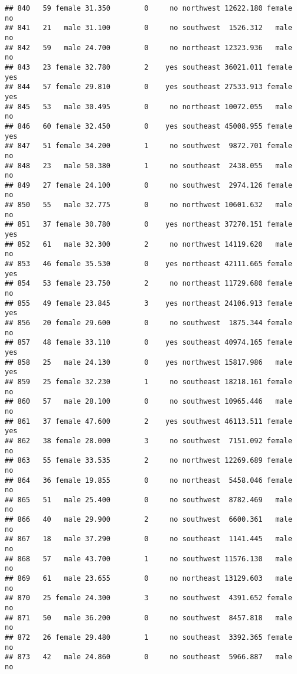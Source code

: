\documentclass[
]{article}
\begin{document}
\begin{verbatim}
## 840   59 female 31.350        0     no northwest 12622.180 female       no
## 841   21   male 31.100        0     no southwest  1526.312   male       no
## 842   59   male 24.700        0     no northeast 12323.936   male       no
## 843   23 female 32.780        2    yes southeast 36021.011 female      yes
## 844   57 female 29.810        0    yes southeast 27533.913 female      yes
## 845   53   male 30.495        0     no northeast 10072.055   male       no
## 846   60 female 32.450        0    yes southeast 45008.955 female      yes
## 847   51 female 34.200        1     no southwest  9872.701 female       no
## 848   23   male 50.380        1     no southeast  2438.055   male       no
## 849   27 female 24.100        0     no southwest  2974.126 female       no
## 850   55   male 32.775        0     no northwest 10601.632   male       no
## 851   37 female 30.780        0    yes northeast 37270.151 female      yes
## 852   61   male 32.300        2     no northwest 14119.620   male       no
## 853   46 female 35.530        0    yes northeast 42111.665 female      yes
## 854   53 female 23.750        2     no northeast 11729.680 female       no
## 855   49 female 23.845        3    yes northeast 24106.913 female      yes
## 856   20 female 29.600        0     no southwest  1875.344 female       no
## 857   48 female 33.110        0    yes southeast 40974.165 female      yes
## 858   25   male 24.130        0    yes northwest 15817.986   male      yes
## 859   25 female 32.230        1     no southeast 18218.161 female       no
## 860   57   male 28.100        0     no southwest 10965.446   male       no
## 861   37 female 47.600        2    yes southwest 46113.511 female      yes
## 862   38 female 28.000        3     no southwest  7151.092 female       no
## 863   55 female 33.535        2     no northwest 12269.689 female       no
## 864   36 female 19.855        0     no northeast  5458.046 female       no
## 865   51   male 25.400        0     no southwest  8782.469   male       no
## 866   40   male 29.900        2     no southwest  6600.361   male       no
## 867   18   male 37.290        0     no southeast  1141.445   male       no
## 868   57   male 43.700        1     no southwest 11576.130   male       no
## 869   61   male 23.655        0     no northeast 13129.603   male       no
## 870   25 female 24.300        3     no southwest  4391.652 female       no
## 871   50   male 36.200        0     no southwest  8457.818   male       no
## 872   26 female 29.480        1     no southeast  3392.365 female       no
## 873   42   male 24.860        0     no southeast  5966.887   male       no

\end{verbatim}
\end{document}
